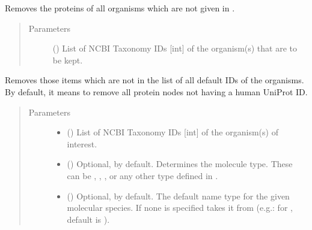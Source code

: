 \documentclass[letterpaper,10pt,english]{sphinxmanual}
\begin{document}
\begin{fulllineitems}
\begin{fulllineitems}
\label{\detokenize{main:pypath.main.PyPath.delete_by_taxon}}
Removes the proteins of all organisms which are not given in
.
\begin{quote}\begin{description}
\item[{Parameters}] \leavevmode
{} () \textendash{} List of NCBI Taxonomy IDs {[}int{]} of the organism(s) that are
to be kept.

\end{description}\end{quote}

\end{fulllineitems}


\begin{fulllineitems}
\label{\detokenize{main:pypath.main.PyPath.delete_unknown}}
Removes those items which are not in the list of all default
IDs of the organisms. By default, it means to remove all protein
nodes not having a human UniProt ID.
\begin{quote}\begin{description}
\item[{Parameters}] \leavevmode\begin{itemize}
\item {} 
 () \textendash{} List of NCBI Taxonomy IDs {[}int{]} of the organism(s) of
interest.

\item {} 
 () \textendash{} Optional,  by default. Determines the molecule
type. These can be , , ,
 or any other type defined in
.

\item {} 
 () \textendash{} Optional,  by default. The default name type for the
given molecular species. If none is specified takes it from
 (e.g.: for
, default is ).


\end{itemize}
\end{description}
\end{quote}
\end{fulllineitems}
\end{fulllineitems}
\end{document}
